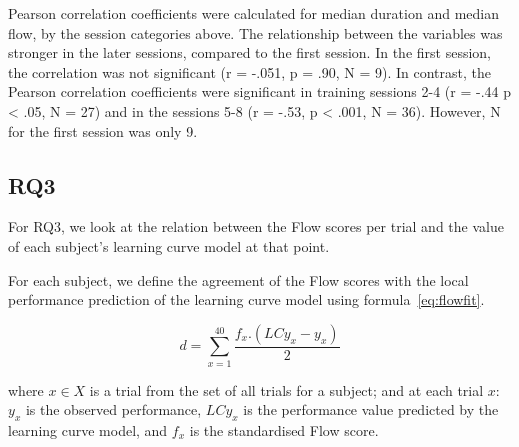 \documentclass[fleqn,10pt]{wlscirep}
\begin{document}
Pearson correlation coefficients were calculated for median duration and median flow, by the session categories above. The relationship between the variables was stronger in the later sessions, compared to the first session. In the first session, the correlation was not significant (r = -.051, p = .90, N = 9). In contrast, the Pearson correlation coefficients were significant in training sessions 2-4 (r = -.44 p < .05, N = 27) and in the sessions 5-8 (r = -.53, p < .001, N = 36). However, N for the first session was only 9.



\subsection*{RQ3}
For RQ3, we look at the relation between the Flow scores per trial and the value of each subject's learning curve model at that point.

For each subject, we define the agreement of the Flow scores with the local performance prediction of the learning curve model using formula~\ref{eq:flowfit}.

\begin{equation}
	\label{eq:flowfit}
	d = \sum_{x=1}^{40} \frac{f_x.(LCy_x - y_x)}{2}
\end{equation}

where $x\in X$ is a trial from the set of all trials for a subject; and at each trial $x$: $y_x$ is the observed performance, $LCy_x$ is the performance value predicted by the learning curve model, and $f_x$ is the standardised Flow score.

\end{document}
